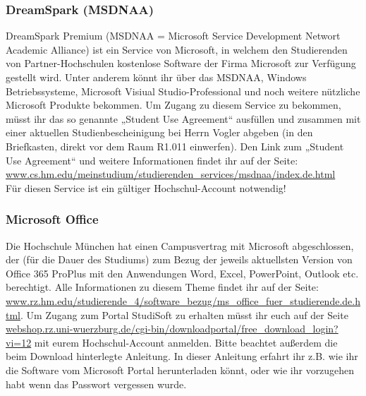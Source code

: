 \subsubsection{DreamSpark (MSDNAA)}
DreamSpark Premium (MSDNAA = Microsoft Service Development 
Networt Academic Alliance) ist ein Service von Microsoft, in welchem 
den Studierenden von Partner-Hochschulen kostenlose Software der 
Firma Microsoft zur Verfügung gestellt wird. \doublebreak
Unter anderem könnt ihr über das MSDNAA, Windows Betriebssysteme, 
Microsoft Visiual Studio-Professional und noch weitere nützliche Microsoft Produkte bekommen. \doublebreak
Um Zugang zu diesem Service zu bekommen, müsst ihr das so genannte 
„Student Use Agreement“ ausfüllen und zusammen mit einer aktuellen 
Studienbescheinigung bei Herrn Vogler abgeben (in den Briefkasten, 
direkt vor dem Raum R1.011 einwerfen). \doublebreak
Den Link zum „Student Use Agreement“ und weitere Informationen 
findet ihr auf der Seite: \url{www.cs.hm.edu/meinstudium/studierenden_services/msdnaa/index.de.html}\\
Für diesen Service ist ein gültiger Hochschul-Account notwendig!

\subsubsection{Microsoft Office}
Die Hochschule München hat einen Campusvertrag mit Microsoft abgeschlossen, der (für die Dauer des Studiums) zum Bezug der jeweils aktuellsten Version von Office 365 ProPlus mit den Anwendungen Word, Excel, PowerPoint, Outlook etc. berechtigt. Alle Informationen zu diesem Theme findet ihr auf der Seite: \url{www.rz.hm.edu/studierende_4/software_bezug/ms_office_fuer_studierende.de.html}.\doublebreak
Um Zugang zum Portal StudiSoft zu erhalten müsst ihr euch auf der Seite \url{webshop.rz.uni-wuerzburg.de/cgi-bin/downloadportal/free_download_login?vi=12} mit eurem Hochschul-Account anmelden. Bitte beachtet außerdem die beim Download hinterlegte Anleitung. In dieser Anleitung erfahrt ihr z.B. wie ihr die Software vom Microsoft Portal herunterladen könnt, oder wie ihr vorzugehen habt wenn das Passwort vergessen wurde.